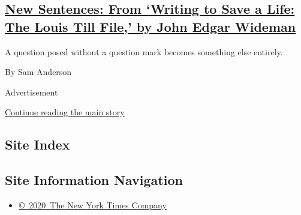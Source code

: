 \begin{enumerate}
  \hypertarget{new-sentences-from-writing-to-save-a-life-the-louis-till-file-by-john-edgar-wideman}{%
  \subsection{\texorpdfstring{\href{/2017/04/25/magazine/new-sentences-from-writing-to-save-a-life-the-louis-till-file-by-john-edgar-wideman.html}{New
  Sentences: From `Writing to Save a Life: The Louis Till File,' by John
  Edgar
  Wideman}}{New Sentences: From `Writing to Save a Life: The Louis Till File,' by John Edgar Wideman}}\label{new-sentences-from-writing-to-save-a-life-the-louis-till-file-by-john-edgar-wideman}}

  A question posed without a question mark becomes something else
  entirely.

  By Sam Anderson
\end{enumerate}

Advertisement

\protect\hyperlink{after-mid1}{Continue reading the main story}

\hypertarget{site-index}{%
\subsection{Site Index}\label{site-index}}

\hypertarget{site-information-navigation}{%
\subsection{Site Information
Navigation}\label{site-information-navigation}}

\begin{itemize}
\tightlist
\item
  \href{https://help.nytimes3xbfgragh.onion/hc/en-us/articles/115014792127-Copyright-notice}{©~2020~The
  New York Times Company}
\end{itemize}

